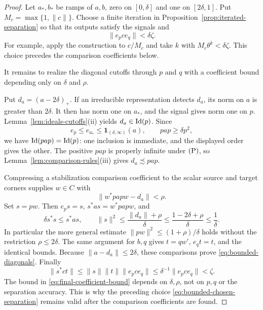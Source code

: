 \begin{proof}
Let \(a_*,b_*\) be ramps of \(a,b\), zero on
\([0,\delta]\) and one on \([2\delta,1]\).
Put \(M_c=\max\{1,\|c\|\}\).  Choose a finite iteration in
Proposition~\ref{prop:iterated-separation} so that its outputs
satisfy the signals and
\begin{equation}\label{eq:bounded-chosen-separation}
 \|e_p c e_q\|<\delta\zeta.
\end{equation}
For example, apply the construction to \(c/M_c\) and take
\(k\) with \(M_c\theta^k<\delta\zeta\).
This choice precedes the comparison coefficients below.

It remains to realize the diagonal cutoffs through \(p\) and \(q\)
with a coefficient bound depending only on \(\delta\) and \(\rho\).

Put \(d_a=(a-2\delta)_+\).  If an irreducible representation
detects \(d_a\), its norm on \(a\) is greater than \(2\delta\).
It then has norm one on \(a_*\), and the signal gives norm
one on \(p\).  Lemma~\ref{lem:ideals-cutoffs}(ii) yields
\(d_a\in\operatorname{Id}(p)\).  Since
\[
 e_p\le e_{a_*}\le\mathbf1_{(\delta,\infty)}(a),
 \qquad pap\ge\delta p^2,
\]
we have \(\operatorname{Id}(pap)=\operatorname{Id}(p)\): one inclusion is immediate, and
the displayed order gives the other.  The positive \(pap\)
is properly infinite under \(\textup{(P)}\), so
Lemma~\ref{lem:comparison-rules}(iii) gives
\(d_a\precsim pap\).

Compressing a stabilization comparison coefficient to the scalar
source and target corners supplies \(w\in C\) with
\[
 \|w^*papw-d_a\|<\rho.
\]
Set \(s=pw\).  Then \(e_ps=s\), \(s^*as=w^*papw\), and
\begin{equation}\label{eq:final-coefficient-bound}
 \delta s^*s\le s^*as,\qquad
 \|s\|^2
 \le\frac{\|d_a\|+\rho}{\delta}
 \le\frac{1-2\delta+\rho}{\delta}
 \le\frac1\delta.
\end{equation}
In particular the more general estimate
\(\|pw\|^2\le(1+\rho)/\delta\) holds without the
restriction \(\rho\le2\delta\).  The same argument for \(b,q\)
gives \(t=qw'\), \(e_qt=t\), and the identical bounds.
Because \(\|a-d_a\|\le2\delta\), these comparisons prove
\eqref{eq:bounded-diagonals}.  Finally
\[
 \|s^*ct\|
 \le\|s\|\|t\|\|e_p c e_q\|
 \le\delta^{-1}\|e_p c e_q\|<\zeta.
\]
The bound in \eqref{eq:final-coefficient-bound} depends on
\(\delta,\rho\), not on \(p,q\) or the separation accuracy.
This is why the preceding choice
\eqref{eq:bounded-chosen-separation} remains valid after the
comparison coefficients are found.
\end{proof}

